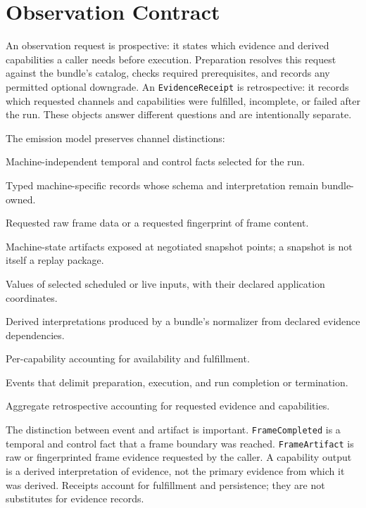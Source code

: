 \section{Observation Contract}

An observation request is prospective: it states which evidence and derived
capabilities a caller needs before execution. Preparation resolves this
request against the bundle's catalog, checks required prerequisites, and
records any permitted optional downgrade. An \texttt{EvidenceReceipt} is
retrospective: it records which requested channels and capabilities were
fulfilled, incomplete, or failed after the run. These objects answer
different questions and are intentionally separate.

The emission model preserves channel distinctions:

\begin{description}[leftmargin=!,labelwidth=0.25\linewidth]
  \item[Normalized events] Machine-independent temporal and control facts
        selected for the run.
  \item[Native evidence] Typed machine-specific records whose schema and
        interpretation remain bundle-owned.
  \item[Frame artifacts] Requested raw frame data or a requested fingerprint
        of frame content.
  \item[Snapshots] Machine-state artifacts exposed at negotiated snapshot
        points; a snapshot is not itself a replay package.
  \item[Input-value evidence] Values of selected scheduled or live inputs,
        with their declared application coordinates.
  \item[Capability outputs] Derived interpretations produced by a bundle's
        normalizer from declared evidence dependencies.
  \item[Capability receipts] Per-capability accounting for availability and
        fulfillment.
  \item[Run lifecycle] Events that delimit preparation, execution, and run
        completion or termination.
  \item[Evidence receipt] Aggregate retrospective accounting for requested
        evidence and capabilities.
\end{description}

The distinction between event and artifact is important. \texttt{FrameCompleted}
is a temporal and control fact that a frame boundary was reached.
\texttt{FrameArtifact} is raw or fingerprinted frame evidence requested by
the caller. A capability output is a derived interpretation of evidence, not
the primary evidence from which it was derived. Receipts account for
fulfillment and persistence; they are not substitutes for evidence records.

